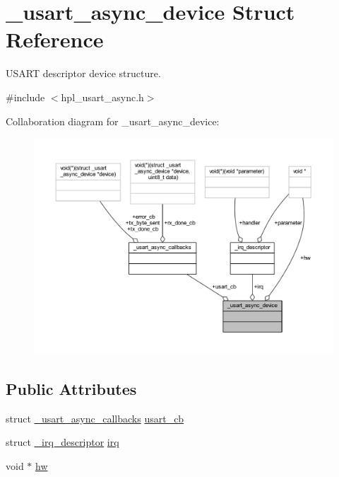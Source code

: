 \hypertarget{struct__usart__async__device}{}\section{\+\_\+usart\+\_\+async\+\_\+device Struct Reference}
\label{struct__usart__async__device}


U\+S\+A\+RT descriptor device structure.  




{\ttfamily \#include $<$hpl\+\_\+usart\+\_\+async.\+h$>$}



Collaboration diagram for \+\_\+usart\+\_\+async\+\_\+device\+:
\nopagebreak
\begin{figure}[H]
\begin{center}
\leavevmode
\includegraphics[width=350pt]{struct__usart__async__device__coll__graph}
\end{center}
\end{figure}
\subsection*{Public Attributes}
\begin{DoxyCompactItemize}
\item 
struct \hyperlink{struct__usart__async__callbacks}{\+\_\+usart\+\_\+async\+\_\+callbacks} \hyperlink{struct__usart__async__device_af36f1abd8113ed4a2f06a9084519f369}{usart\+\_\+cb}
\item 
struct \hyperlink{struct__irq__descriptor}{\+\_\+irq\+\_\+descriptor} \hyperlink{struct__usart__async__device_a0eb2cf8aa3661fe0a22168429c04bf57}{irq}
\item 
void $\ast$ \hyperlink{struct__usart__async__device_a3eae9af22755ddfe25f8406c2939262f}{hw}
\end{DoxyCompactItemize}


